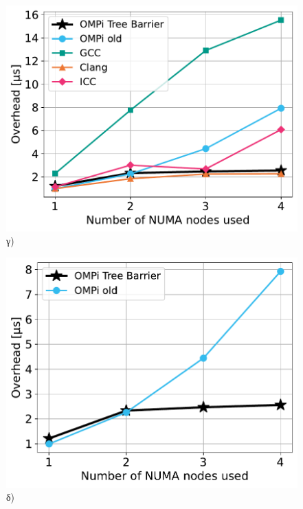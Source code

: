 \begin{figure}[htbp]
\begin{minipage}{0.5\textwidth}
        \centering
        \includegraphics[width=1\textwidth]{Figures/parade-epcc/topothreads_tpn-16_spread.pdf}
        γ)
    \end{minipage}\hfill
    \begin{minipage}{0.5\textwidth}
        \centering
        \includegraphics[width=1\textwidth]{Figures/parade-epcc/ompionly_topothreads_tpn-16_spread.pdf}
        δ)
    \end{minipage}
    \newline
    \begin{minipage}{0.5\textwidth}
        \centering

\end{minipage}
\end{figure}
